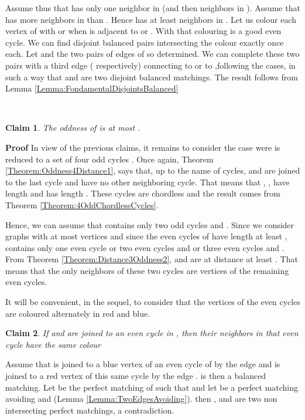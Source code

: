 \documentclass{elsart}
\theoremstyle{plain} \theoremheaderfont{\scshape}
\newtheorem{Clm}{Claim}[Thm]
\newenvironment{Prf}{{\bf \noindent Proof } }{\hfill\\}
\newenvironment{PrfClaim}{{\bf Proof }}{{\hfill\tiny{\\}}}
\begin{document}
\begin{Prf}
\begin{PrfClaim}
Assume thus that  has only one neighbor in  (and then 
neighbors in ). Assume that  has more neighbors in 
than . Hence  has at least  neighbors in . Let us
colour each vertex  of  with  or  when  is
adjacent to  or . With that colouring  is a good
even cycle. We can find  disjoint balanced pairs intersecting the
colour  exactly once each. Let  and  the two
pairs of edges of  so determined. We can complete these two pairs
with a third edge  ( respectively) connecting  to 
or  to ,following the cases, in such a way that
 and  are two disjoint balanced
matchings. The result follows from Lemma
\ref{Lemma:FondamentalDisjointsBalanced}



\end{PrfClaim}

\begin{Clm} \label{Claim:Claim5MinimumCounterExample32}
The oddness of  is at most .
\end{Clm}
\begin{PrfClaim} In view of the previous claims, it remains to consider the case were  is reduced to a
set of four odd cycles . Once again, Theorem
\ref{Theorem:Oddness4Distance1}, says that, up to the name of
cycles,  and  are joined to the last cycle  and
have no other neighboring cycle. That means that , , 
have length  and  has length . These  cycles are
chordless and the result comes from Theorem
\ref{Theorem:4OddChordlessCycles}.
\end{PrfClaim}




Hence, we can assume that  contains only two odd cycles
 and . Since we consider graphs with at most  vertices
and since the even cycles of  have length at least ,
 contains only one even cycle  or two even cycles
 and  or three even cycles  and . From
Theorem \ref{Theorem:Distance3Oddness2},  and  are at
distance at least . That means that the only neighbors of these
two cycles are vertices of the remaining even cycles.

It will be convenient, in the sequel, to consider  that the vertices
of the even cycles are coloured alternately in red and blue.

\begin{Clm} \label{Claim:Claim6MinimumCounterExample32}
If  and  are  joined to an even cycle in ,
then their neighbors in that even cycle have the same colour
\end{Clm}
\begin{PrfClaim}
 Assume
that  is joined to a blue vertex of an even cycle of  by the edge  and  is joined to a red vertex of this same
cycle  by the edge .  is then a balanced
matching. Let  be the perfect matching of  such that   and let  be a perfect matching avoiding  and
 (Lemma \ref{Lemma:TwoEdgesAvoiding}). then ,  and 
are two non intersecting perfect matchings, a contradiction.
\end{PrfClaim}


\end{Prf}
\end{document}
